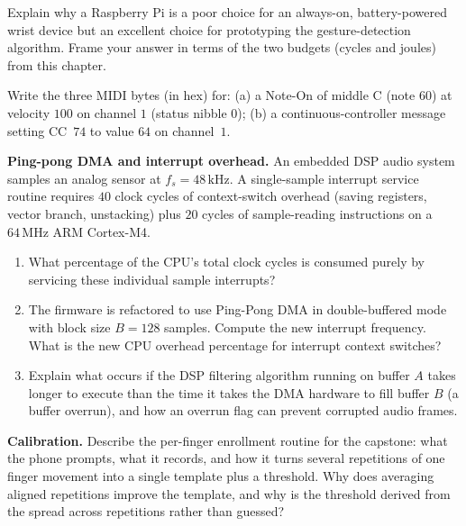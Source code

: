\begin{exercise}
Explain why a Raspberry Pi is a poor choice for an always-on, battery-powered wrist device but an
excellent choice for prototyping the gesture-detection algorithm. Frame your answer in terms of the
two budgets (cycles and joules) from this chapter.
\end{exercise}

\begin{exercise}
Write the three MIDI bytes (in hex) for: (a) a Note-On of middle C (note $60$) at velocity $100$ on
channel $1$ (status nibble $0$); (b) a continuous-controller message setting CC~$74$ to value $64$
on channel~$1$.
\end{exercise}

\begin{exercise}
\textbf{Ping-pong DMA and interrupt overhead.} An embedded DSP audio system samples an analog sensor at $f_s = 48\,\text{kHz}$. A single-sample interrupt service routine requires $40$ clock cycles of context-switch overhead (saving registers, vector branch, unstacking) plus $20$ cycles of sample-reading instructions on a $64\,\text{MHz}$ ARM Cortex-M4.
\begin{enumerate}[label=(\alph*)]
  \item What percentage of the CPU's total clock cycles is consumed purely by servicing these individual sample interrupts?
  \item The firmware is refactored to use Ping-Pong DMA in double-buffered mode with block size $B = 128$ samples. Compute the new interrupt frequency. What is the new CPU overhead percentage for interrupt context switches?
  \item Explain what occurs if the DSP filtering algorithm running on buffer $A$ takes longer to execute than the time it takes the DMA hardware to fill buffer $B$ (a buffer overrun), and how an overrun flag can prevent corrupted audio frames.
\end{enumerate}
\end{exercise}

\begin{exercise}
\textbf{Calibration.} Describe the per-finger enrollment routine for the capstone: what the phone
prompts, what it records, and how it turns several repetitions of one finger movement into a single
template plus a threshold. Why does averaging aligned repetitions improve the template, and why is
the threshold derived from the spread across repetitions rather than guessed?
\end{exercise}

